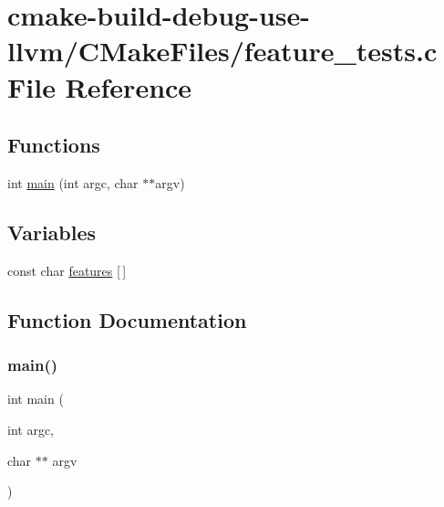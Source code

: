 \hypertarget{cmake-build-debug-use-llvm_2_c_make_files_2feature__tests_8c}{}\section{cmake-\/build-\/debug-\/use-\/llvm/\+C\+Make\+Files/feature\+\_\+tests.c File Reference}
\label{cmake-build-debug-use-llvm_2_c_make_files_2feature__tests_8c}
\subsection*{Functions}
\begin{DoxyCompactItemize}
\item 
int \mbox{\hyperlink{cmake-build-debug-use-llvm_2_c_make_files_2feature__tests_8c_a3c04138a5bfe5d72780bb7e82a18e627}{main}} (int argc, char $\ast$$\ast$argv)
\end{DoxyCompactItemize}
\subsection*{Variables}
\begin{DoxyCompactItemize}
\item 
const char \mbox{\hyperlink{cmake-build-debug-use-llvm_2_c_make_files_2feature__tests_8c_a1582568e32f689337602a16bf8a5bff0}{features}} \mbox{[}$\,$\mbox{]}
\end{DoxyCompactItemize}


\subsection{Function Documentation}
\mbox{\label{cmake-build-debug-use-llvm_2_c_make_files_2feature__tests_8c_a3c04138a5bfe5d72780bb7e82a18e627}} 
\subsubsection{\texorpdfstring{main()}{main()}}
{\footnotesize\ttfamily int main (\begin{DoxyParamCaption}\item[{int}]{argc,  }\item[{char $\ast$$\ast$}]{argv }\end{DoxyParamCaption})}



